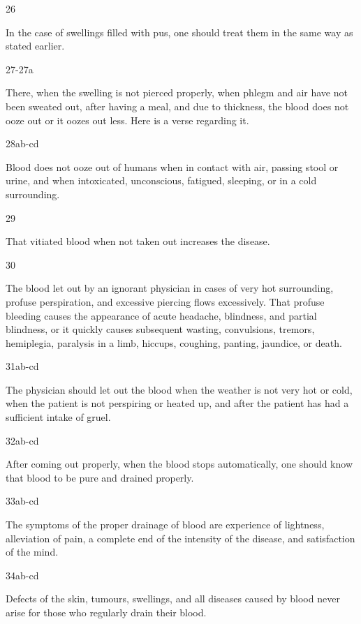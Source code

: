\begin{translation}
\item[26]

In the case of swellings filled with pus, one should treat them in the same way as stated earlier.

\item[27-27a]

There, when the swelling is not pierced properly, when phlegm and air have not been sweated out, after having a meal, and due to thickness, the blood does not ooze out or it oozes out less.
Here is a verse regarding it.

\item[28ab-cd]

Blood does not ooze out of humans when in contact with air, passing stool or urine, and when intoxicated, unconscious, fatigued, sleeping, or in a cold surrounding.

\item[29] 

That vitiated blood when not taken out increases the disease.

\item[30]

The blood let out by an ignorant physician in cases of very hot surrounding, profuse perspiration, and excessive piercing flows excessively. That profuse bleeding causes the appearance of acute headache, blindness, and partial blindness, or it quickly causes subsequent wasting, convulsions, tremors, hemiplegia, paralysis in a limb, hiccups, coughing, panting, jaundice, or death.  

\item[31ab-cd]

The physician should let out the blood when the weather is not very hot or cold, when the patient is not perspiring or heated up, and after the patient has had a sufficient intake of gruel. 

\item[32ab-cd]

After coming out properly, when the blood stops automatically, one should know that blood to be pure and drained properly.

\item[33ab-cd]

The symptoms of the proper drainage of blood are experience of lightness, alleviation of pain, a complete end of the intensity of the disease, and satisfaction of the mind.

\item[34ab-cd] 

Defects of the skin, tumours, swellings, and all diseases caused by blood never arise for those who regularly drain their blood.

\end{translation}

